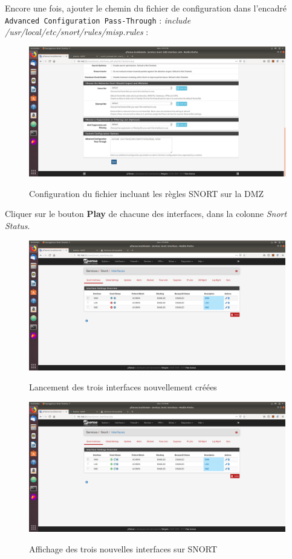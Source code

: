 Encore une fois, ajouter le chemin du fichier de configuration dans l'encadré \texttt{Advanced Configuration Pass-Through} : \textit{include /usr/local/etc/snort/rules/misp.rules} :
\begin{figure}[h!]
    \begin{center}
        \includegraphics[scale=0.31]{MISP_Screenshots/Snort/15.png}
        \label{MISP_Screenshots/Snort/15}
        \caption{Configuration du fichier incluant les règles SNORT sur la DMZ}
    \end{center}
\end{figure}
\FloatBarrier

\pagebreak

Cliquer sur le bouton \textbf{Play} de chacune des interfaces, dans la colonne \textit{Snort Status}.
\begin{figure}[h!]
    \begin{center}
        \includegraphics[scale=0.31]{MISP_Screenshots/Snort/16.png}
        \label{MISP_Screenshots/Snort/16}
        \caption{Lancement des trois interfaces nouvellement créées}
    \end{center}
\end{figure}
\FloatBarrier


\begin{figure}[h!]
    \begin{center}
        \includegraphics[scale=0.35]{MISP_Screenshots/Snort/17.png}
        \label{MISP_Screenshots/Snort/17}
        \caption{Affichage des trois nouvelles interfaces sur SNORT}
    \end{center}
\end{figure}
\FloatBarrier 
    